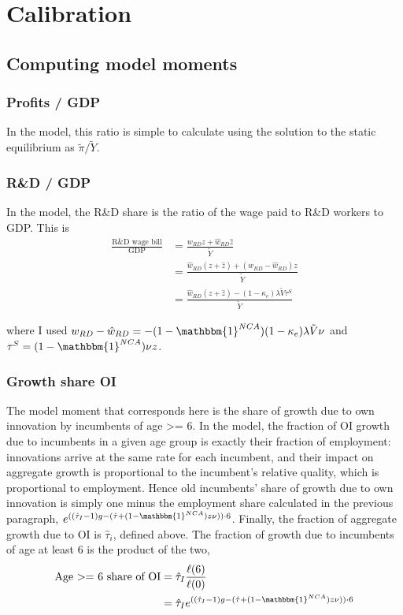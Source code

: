 \documentclass[11pt,english]{article}
\begin{document}
\section{Calibration}\label{appendix:calibration}

\subsection{Computing model moments}

\subsubsection{Profits / GDP}\label{appendix:calibration:profits/gdp}

In the model, this ratio is simple to calculate using the solution to the static equilibrium as $\tilde{\pi} / \tilde{Y}$.

\subsubsection{R\&D / GDP}\label{appendix:calibration:rd/gdp}

In the model, the R\&D share is the ratio of the wage paid to R\&D workers to GDP. This is
\begin{align*}
\frac{\textrm{R\&D wage bill}}{\textrm{GDP}} &= \frac{w_{RD} z + \hat{w}_{RD} \hat{z}}{\tilde{Y}} \\ 
&= \frac{\hat{w}_{RD} (z + \hat{z}) + (w_{RD} - \hat{w}_{RD})z}{\tilde{Y}} \\
&= \frac{\hat{w}_{RD} (z + \hat{z}) - (1-\kappa_e) \lambda \tilde{V} \tau^S}{\tilde{Y}}
\end{align*}

where I used $w_{RD} - \hat{w}_{RD} = -(1-\mathbbm{1}^{NCA})(1-\kappa_e) \lambda \tilde{V} \nu$ and $\tau^S = (1-\mathbbm{1}^{NCA})\nu z$. 

\subsubsection{Growth share OI}\label{appendix:calibration:growthShareOI}

The model moment that corresponds here is the share of growth due to own innovation by incumbents of age >= 6. In the model, the fraction of OI growth due to incumbents in a given age group is exactly their fraction of employment: innovations arrive at the same rate for each incumbent, and their impact on aggregate growth is proportional to the incumbent's relative quality, which is proportional to employment. Hence old incumbents' share of growth due to own innovation is simply one minus the employment share calculated in the previous paragraph, $e^{((\hat{\tau}_I -1)g - (\hat{\tau} + (1-\mathbbm{1}^{NCA})z \nu))\cdot 6}$. Finally, the fraction of aggregate growth due to OI is $\hat{\tau}_i$, defined above. The fraction of growth due to incumbents of age at least 6 is the product of the two, 
\begin{align*}
\textrm{Age >= 6 share of OI} &= \hat{\tau}_I \frac{\ell(6)}{\ell(0)} \\
&= \hat{\tau}_I e^{((\hat{\tau}_I -1)g - (\hat{\tau} + (1-\mathbbm{1}^{NCA})z \nu))\cdot 6} 
\end{align*}
\end{document}
